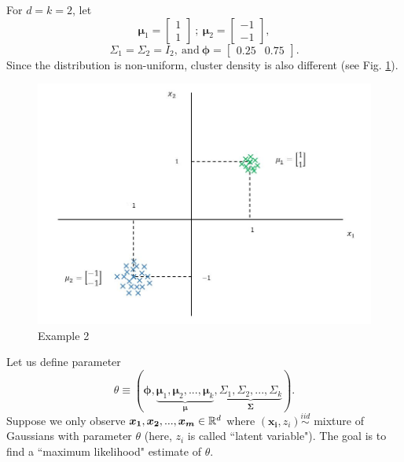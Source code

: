 \documentclass[a4paper,english,12pt]{article}
\begin{document}
\begin{exmp}\label{exmp:2}
For $d=k=2$, let \begin{equation*}
\boldsymbol{\mu}_1=\begin{bmatrix}
1\\
1
\end{bmatrix}
~;~ \boldsymbol{\mu}_2=\begin{bmatrix}
-1\\
-1
\end{bmatrix},
\end{equation*}
\begin{equation*}
\Sigma_1=\Sigma_2=I_2,~\mbox{and}~\pmb{\phi}=
\begin{bmatrix}
    0.25   &0.75
    \end{bmatrix}.
\end{equation*}
Since the distribution is non-uniform, cluster density is also different (see Fig. \ref{fig:Example 2}).
\begin{figure}[h]
\centering
\includegraphics[width=0.9\linewidth]{Figures/Lect26fig2.jpg}
\caption[rdr]{Example 2}
\label{fig:Example 2}
\end{figure}
\end{exmp}
Let us define parameter 
\begin{equation}
\theta\equiv(\pmb{\phi}, \underbrace{\boldsymbol{\mu}_1, \boldsymbol{\mu}_2, ...,\boldsymbol{\mu}_k}_{\boldsymbol{\mu}}, \underbrace{\Sigma_1, \Sigma_2, ...,\Sigma_k}_{\boldsymbol{\Sigma}}).
\end{equation}
Suppose we only observe $\boldsymbol{x_1},\boldsymbol{x_2},...,\boldsymbol{x_m}\in \mathbb{R}^d$ where $(\boldsymbol{x_i},z_i)\overset{iid}{\sim }$ mixture of Gaussians with parameter $\theta$ (here, $z_i$ is called ``latent variable"). The goal is to find a ``maximum likelihood" estimate of $\theta$.
\end{document}
